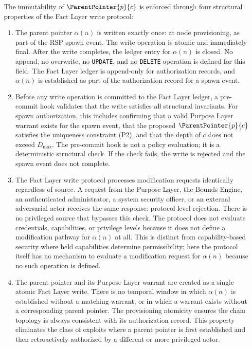 The immutability of $\ParentPointer{p}{c}$ is enforced through four structural properties of the Fact Layer write protocol:

\begin{enumerate}
    \item[(I1) \textbf{Write-once provisioning}] The parent pointer $\alpha(n)$ is written exactly once: at node provisioning, as part of the RSP spawn event. The write operation is atomic and immediately final. After the write completes, the ledger entry for $\alpha(n)$ is closed. No append, no overwrite, no \texttt{UPDATE}, and no \texttt{DELETE} operation is defined for this field. The Fact Layer ledger is append-only for authorization records, and $\alpha(n)$ is established as part of the authorization record for a spawn event.

    \item[(I2) \textbf{Pre-commit hook enforcement}] Before any write operation is committed to the Fact Layer ledger, a pre-commit hook validates that the write satisfies all structural invariants. For spawn authorization, this includes confirming that a valid Purpose Layer warrant exists for the spawn event, that the proposed $\ParentPointer{p}{c}$ satisfies the uniqueness constraint (P2), and that the depth of $c$ does not exceed $D_{\max}$. The pre-commit hook is not a policy evaluation; it is a deterministic structural check. If the check fails, the write is rejected and the spawn event does not complete.

    \item[(I3) \textbf{No override pathway}] The Fact Layer write protocol processes modification requests identically regardless of source. A request from the Purpose Layer, the Bounds Engine, an authenticated administrator, a system security officer, or an external adversarial actor receives the same response: protocol-level rejection. There is no privileged source that bypasses this check. The protocol does not evaluate credentials, capabilities, or privilege levels because it does not define a modification pathway for $\alpha(n)$ at all. This is distinct from capability-based security where held capabilities determine permissibility; here the protocol itself has no mechanism to evaluate a modification request for $\alpha(n)$ because no such operation is defined.

    \item[(I4) \textbf{Atomic warrant-pointer creation}] The parent pointer and its Purpose Layer warrant are created as a single atomic Fact Layer write. There is no temporal window in which $\alpha(n)$ is established without a matching warrant, or in which a warrant exists without a corresponding parent pointer. The provisioning atomicity ensures the chain topology is always consistent with its authorization record. This property eliminates the class of exploits where a parent pointer is first established and then retroactively authorized by a different or more privileged actor.
\end{enumerate}

